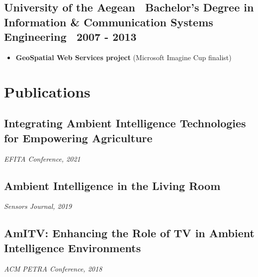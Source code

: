 \documentclass[a4paper,10pt]{article}
\begin{document}
\subsection*{University of the Aegean \textbar\ Bachelor's Degree in Information \& Communication Systems Engineering \textbar\ 2007 - 2013}
\begin{itemize}[left=0pt]
    \item \textbf{GeoSpatial Web Services project} (Microsoft Imagine Cup finalist)
\end{itemize}

\vspace{2pt}

\section*{ Publications}
\subsection*{Integrating Ambient Intelligence Technologies for Empowering Agriculture}
\textit{EFITA Conference, 2021}  

\subsection*{Ambient Intelligence in the Living Room}
\textit{Sensors Journal, 2019}  

\subsection*{AmITV: Enhancing the Role of TV in Ambient Intelligence Environments}
\textit{ACM PETRA Conference, 2018}  

\vspace{2pt}
\end{document}

